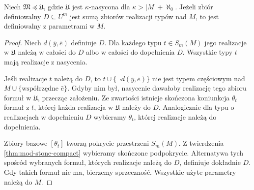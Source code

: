 \begin{lemat}
\label{lem:mod-invariant-definition-descent}
Niech $\mathfrak M\preccurlyeq\mathfrak U$,
gdzie $\mathfrak U$ jest $\kappa$-nasycona
dla $\kappa>|M|+\aleph_0$.
Jeżeli zbiór definiowalny $D\subseteq U^m$
jest sumą zbiorów realizacji typów nad $M$,
to jest definiowalny z parametrami w $M$.
\end{lemat}
\begin{proof}
Niech $d(\bar y,\bar e)$ definiuje $D$.
Dla każdego typu $t\in S_m(M)$ jego realizacje
w $\mathfrak U$ należą w całości do $D$
albo w całości do dopełnienia $D$.
Wszystkie typy $t$ mają realizacje
z nasycenia.

Jeśli realizacje $t$ należą do $D$, to
$t\cup\{\neg d(\bar y,\bar e)\}$ nie jest
typem częściowym nad $M\cup\{\text{współrzędne }\bar e\}$.
Gdyby nim był, nasycenie dawałoby realizację
tego zbioru formuł w $\mathfrak U$,
przecząc założeniu.
Ze zwartości istnieje skończona koniunkcja
$\theta_t$ formuł z $t$, której każda
realizacja w $\mathfrak U$ należy do $D$.
Analogicznie dla typu o realizacjach
w dopełnieniu $D$ wybieramy $\theta_t$,
której realizacje należą do dopełnienia.

Zbiory bazowe $[\theta_t]$ tworzą pokrycie
przestrzeni $S_m(M)$. Z twierdzenia
\ref{thm:mod-stone-compact} wybieramy
skończone podpokrycie.
Alternatywa tych spośród wybranych formuł,
których realizacje należą do $D$,
definiuje dokładnie $D$.
Gdy takich formuł nie ma, bierzemy
sprzeczność. Wszystkie użyte parametry
należą do $M$.
\end{proof}


